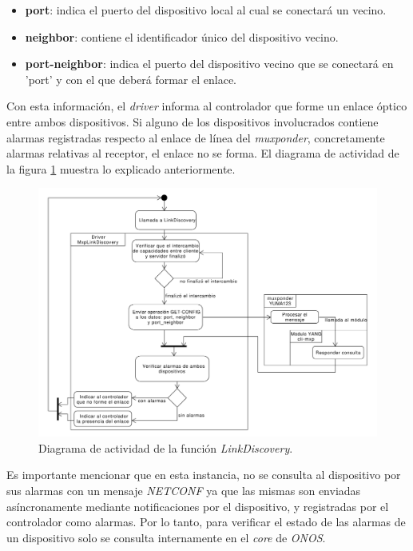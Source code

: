 \begin{itemize}
	\item \textbf{port}: indica el puerto del dispositivo local al cual se conectará un vecino.
    
    \item \textbf{neighbor}: contiene el identificador único del dispositivo vecino.
    
    \item \textbf{port-neighbor}: indica el puerto del dispositivo vecino que se conectará en 'port' y con el que deberá formar el enlace.
\end{itemize}

Con esta información, el \textit{driver} informa al controlador que forme un enlace óptico entre ambos dispositivos. Si alguno de los dispositivos involucrados contiene alarmas registradas respecto al enlace de línea del \textit{muxponder}, concretamente alarmas relativas al receptor, el enlace no se forma. El diagrama de actividad de la figura \ref{fig:actividad_link} muestra lo explicado anteriormente.

\begin{figure}[!h]
    \centering
    \includegraphics[scale=0.43]{Figures/actividad_link.pdf}
    \caption{Diagrama de actividad de la función \textit{LinkDiscovery}.}
    \label{fig:actividad_link}
  \end{figure}

  Es importante mencionar que en esta instancia, no se consulta al dispositivo por sus alarmas con un mensaje \textit{NETCONF} ya que las mismas son enviadas asíncronamente mediante notificaciones por el dispositivo, y registradas por el controlador como alarmas. Por lo tanto, para verificar el estado de las alarmas de un dispositivo solo se consulta internamente en el \textit{core} de \textit{ONOS}.

